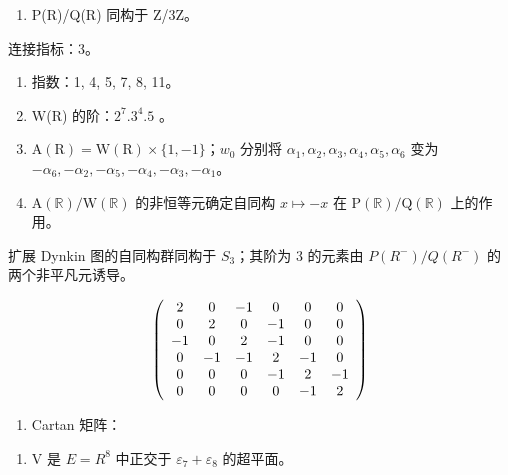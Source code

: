 \begin{enumerate}
\def\labelenumi{(\Roman{enumi})}
\setcounter{enumi}{7}
\tightlist
\item
  P(R)/Q(R) 同构于 Z/3Z。
\end{enumerate}

连接指标：3。

\begin{enumerate}
\def\labelenumi{(\Roman{enumi})}
\setcounter{enumi}{8}
\item
  指数：1, 4, 5, 7, 8, 11。
\item
  W(R) 的阶：\(2^{7}.3^{4}.5\) 。
\item
  \(\mathrm{A}(\mathrm{R}) = \mathrm{W}(\mathrm{R}) \times \{1, -1\}\)；\(w_0\) 分别将 \(\alpha_1, \alpha_2, \alpha_3, \alpha_4, \alpha_5, \alpha_6\) 变为 \(-\alpha_6, -\alpha_2, -\alpha_5, -\alpha_4, -\alpha_3, -\alpha_1\)。
\item
  \(\mathrm{A}(\mathbb{R}) / \mathrm{W}(\mathbb{R})\) 的非恒等元确定自同构 \(x \mapsto -x\) 在 \(\mathrm{P}(\mathbb{R}) / \mathrm{Q}(\mathbb{R})\) 上的作用。
\end{enumerate}

扩展 Dynkin 图的自同构群同构于 \(S_{3}\)；其阶为 3 的元素由 \(P(R^{-})/Q(R^{-})\) 的两个非平凡元诱导。

\[
\left( \begin{array}{c c c c c c} 2 & 0 & - 1 & 0 & 0 & 0 \\ 0 & 2 & 0 & - 1 & 0 & 0 \\ - 1 & 0 & 2 & - 1 & 0 & 0 \\ 0 & - 1 & - 1 & 2 & - 1 & 0 \\ 0 & 0 & 0 & - 1 & 2 & - 1 \\ 0 & 0 & 0 & 0 & - 1 & 2 \end{array} \right)
\]

\begin{enumerate}
\def\labelenumi{(\Roman{enumi})}
\setcounter{enumi}{12}
\tightlist
\item
  Cartan 矩阵：
\end{enumerate}


\begin{enumerate}
\def\labelenumi{(\Roman{enumi})}
\tightlist
\item
  V 是 \(E = R^{8}\) 中正交于 \(\varepsilon_{7} + \varepsilon_{8}\) 的超平面。
\end{enumerate}

